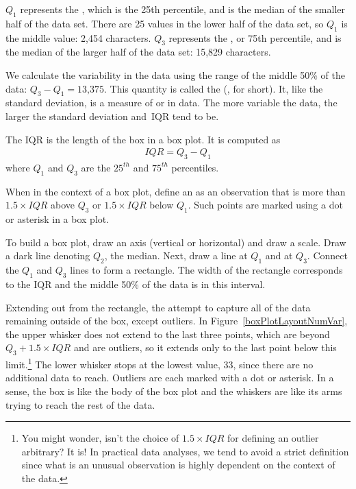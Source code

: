 $Q_1$ represents the , which is the 25th percentile, and is the median of the smaller half of the data set. There are 25 values in the lower half of the data set, so $Q_1$ is the middle value: 2,454 characters. $Q_3$ represents the , or 75th percentile, and is the median of the larger half of the data set: 15,829 characters.

We calculate the variability in the data using the range of the middle 50\% of the data: $Q_3 - Q_1 = \text{13,375}$. This quantity is called the  (, for short). It, like the standard deviation, is a measure of  or  in data. The more variable the data, the larger the standard deviation and~IQR tend to be.

\begin{termBox}{
The IQR is the length of the box in a box plot. It is computed as
\begin{eqnarray*}
IQR = Q_3 - Q_1
\end{eqnarray*}
where $Q_1$ and $Q_3$ are the $25^{th}$ and $75^{th}$ percentiles.}
\end{termBox}

\begin{termBox}{
When in the context of a box plot, define an  as an \mbox{observation} that is more than $1.5 \times IQR$ above $Q_3$ or $1.5 \times IQR$ below $Q_1$. Such points are marked using a dot or asterisk in a box plot.}
\end{termBox}

To build a box plot, draw an axis (vertical or horizontal) and draw a scale. Draw a dark line denoting $Q_2$, the median. Next, draw a line at $Q_1$ and at $Q_3$. Connect the $Q_1$ and $Q_3$ lines to form a rectangle. The width of the rectangle corresponds to the IQR and the middle 50\% of the data is in this interval.

Extending out from the rectangle, the  attempt to capture all of the data remaining outside of the box, except outliers. In Figure~\ref{boxPlotLayoutNumVar}, the upper whisker does not extend to the last three points, which are beyond $Q_3 + 1.5\times IQR$ and are outliers, so it extends only to the last point below this limit.\footnote{You might wonder, isn't the choice of $1.5 \times IQR$ for defining an outlier arbitrary? It is! In practical data analyses, we tend to avoid a strict definition since what is an unusual observation is highly dependent on the context of the data.} The lower whisker stops at the lowest value, 33, since there are no additional data to reach. Outliers are each marked with a dot or asterisk. In a sense, the box is like the body of the box plot and the whiskers are like its arms trying to reach the rest of the data.

